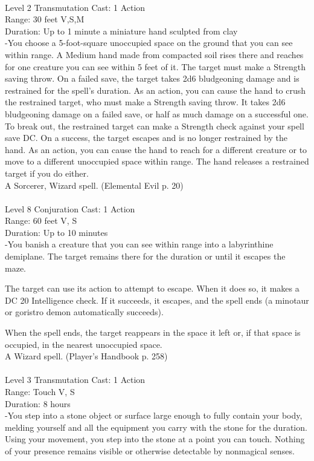 \documentclass[10pt,twocolumn]{report}
\begin{document}
 \\
Level 2 \quad Transmutation \quad Cast: 1 Action\\
Range: 30 feet \quad V,S,M\\
Duration: Up to 1 minute \quad a miniature hand sculpted from clay\\
-You choose a 5-foot-square unoccupied space on the ground that you can see within range. A Medium hand made from compacted soil rises there and reaches
for one creature you can see within 5 feet of it. The target must make a Strength saving throw. On a failed save, the target takes 2d6 bludgeoning damage and is restrained for the spell’s duration.
As an action, you can cause the hand to crush the restrained target, who must make a Strength saving throw. It takes 2d6 bludgeoning damage on a failed save, or half as much damage on a successful one.
To break out, the restrained target can make a Strength check against your spell save DC. On a success, the target escapes and is no longer restrained by the hand.
As an action, you can cause the hand to reach for a different creature or to move to a different unoccupied space within range. The hand releases a restrained target if you do either.\\
A Sorcerer, Wizard spell. (Elemental Evil p. 20) \\


 \\
Level 8 \quad Conjuration \quad Cast: 1 Action\\
Range: 60 feet \quad V, S\\
Duration: Up to 10 minutes \quad \\
-You banish a creature that you can see within range into a labyrinthine demiplane. The target remains there for the duration or until it escapes the maze.

The target can use its action to attempt to escape. When it does so, it makes a DC 20 Intelligence check. If it succeeds, it escapes, and the spell ends (a minotaur or goristro demon automatically succeeds).

When the spell ends, the target reappears in the space it left or, if that space is occupied, in the nearest unoccupied space.\\
A Wizard spell. (Player's Handbook p. 258) \\


 \\
Level 3 \quad Transmutation \quad Cast: 1 Action\\
Range: Touch \quad V, S\\
Duration: 8 hours \quad \\
-You step into a stone object or surface large enough to fully contain your body, melding yourself and all the equipment you carry with the stone for the duration.
Using your movement, you step into the stone at a point you can touch. Nothing of your presence remains visible or otherwise detectable by nonmagical senses.
\end{document}
